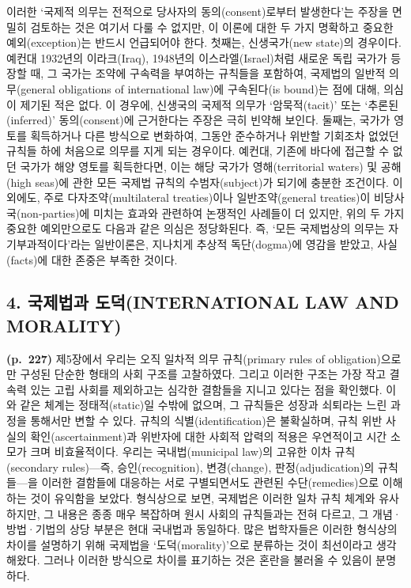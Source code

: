 이러한 `국제적 의무는 전적으로 당사자의 동의(consent)로부터 발생한다'는
주장을 면밀히 검토하는 것은 여기서 다룰 수 없지만, 이 이론에 대한 두
가지 명확하고 중요한 예외(exception)는 반드시 언급되어야 한다. 첫째는,
신생국가(new state)의 경우이다. 예컨대 1932년의 이라크(Iraq), 1948년의
이스라엘(Israel)처럼 새로운 독립 국가가 등장할 때, 그 국가는 조약에
구속력을 부여하는 규칙들을 포함하여, 국제법의 일반적 의무(general
obligations of international law)에 구속된다(is bound)는 점에 대해,
의심이 제기된 적은 없다. 이 경우에, 신생국의 국제적 의무가
`암묵적(tacit)' 또는 `추론된(inferred)' 동의(consent)에 근거한다는
주장은 극히 빈약해 보인다. 둘째는, 국가가 영토를 획득하거나 다른
방식으로 변화하여, 그동안 준수하거나 위반할 기회조차 없었던 규칙들 하에
처음으로 의무를 지게 되는 경우이다. 예컨대, 기존에 바다에 접근할 수 없던
국가가 해양 영토를 획득한다면, 이는 해당 국가가 영해(territorial waters)
및 공해(high seas)에 관한 모든 국제법 규칙의 수범자(subject)가 되기에
충분한 조건이다. 이 외에도, 주로 다자조약(multilateral treaties)이나
일반조약(general treaties)이 비당사국(non-parties)에 미치는 효과와
관련하여 논쟁적인 사례들이 더 있지만, 위의 두 가지 중요한 예외만으로도
다음과 같은 의심은 정당화된다. 즉, `모든 국제법상의 의무는
자기부과적이다'라는 일반이론은, 지나치게 추상적 독단(dogma)에 영감을
받았고, 사실(facts)에 대한 존중은 부족한 것이다.

\subsection{4. 국제법과 도덕(INTERNATIONAL LAW AND
MORALITY)}\label{uxad6duxc81cuxbc95uxacfc-uxb3c4uxb355international-law-and-morality}

\textbf{(p.~227)} 제5장에서 우리는 오직 일차적 의무 규칙(primary rules
of obligation)으로만 구성된 단순한 형태의 사회 구조를 고찰하였다. 그리고
이러한 구조는 가장 작고 결속력 있는 고립 사회를 제외하고는 심각한
결함들을 지니고 있다는 점을 확인했다. 이와 같은 체계는 정태적(static)일
수밖에 없으며, 그 규칙들은 성장과 쇠퇴라는 느린 과정을 통해서만 변할 수
있다. 규칙의 식별(identification)은 불확실하며, 규칙 위반 사실의
확인(ascertainment)과 위반자에 대한 사회적 압력의 적용은 우연적이고 시간
소모가 크며 비효율적이다. 우리는 국내법(municipal law)의 고유한 이차
규칙(secondary rules)---즉, 승인(recognition), 변경(change),
판정(adjudication)의 규칙들---을 이러한 결함들에 대응하는 서로
구별되면서도 관련된 수단(remedies)으로 이해하는 것이 유익함을 보았다.
형식상으로 보면, 국제법은 이러한 일차 규칙 체계와 유사하지만, 그 내용은
종종 매우 복잡하며 원시 사회의 규칙들과는 전혀 다르고, 그
개념·방법·기법의 상당 부분은 현대 국내법과 동일하다. 많은 법학자들은
이러한 형식상의 차이를 설명하기 위해 국제법을 `도덕(morality)'으로
분류하는 것이 최선이라고 생각해왔다. 그러나 이러한 방식으로 차이를
표기하는 것은 혼란을 불러올 수 있음이 분명하다.

